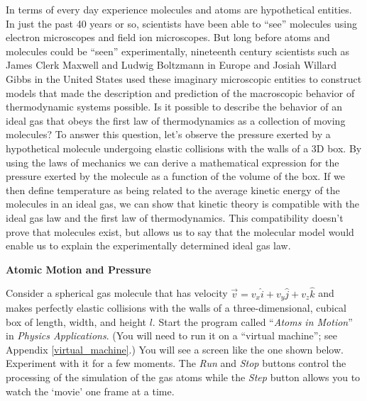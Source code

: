In terms of every day experience molecules and atoms are hypothetical
entities. In just the past 40 years or so, scientists have been able
to ``see'' molecules using electron microscopes and
field ion microscopes. But long before atoms and molecules could be
``seen'' experimentally, nineteenth century scientists
such as James Clerk Maxwell and Ludwig Boltzmann in Europe and Josiah
Willard Gibbs in the United States used these imaginary microscopic
entities to construct models that made the description and prediction
of the macroscopic behavior of thermodynamic systems possible. Is
it possible to describe the behavior of an ideal gas that obeys the
first law of thermodynamics as a collection of moving molecules? To
answer this question, let's observe the pressure exerted by a hypothetical
molecule undergoing elastic collisions with the walls of a 3D box.
By using the laws of mechanics we can derive a mathematical expression
for the pressure exerted by the molecule as a function of the volume
of the box. If we then define temperature as being related to the
average kinetic energy of the molecules in an ideal gas, we can show
that kinetic theory is compatible with the ideal gas law and the first
law of thermodynamics. This compatibility doesn't prove that molecules
exist, but allows us to say that the molecular model would enable
us to explain the experimentally determined ideal gas law.

\textbf{Atomic Motion and Pressure}

Consider a spherical gas molecule that has velocity 
$\overrightarrow{v}=v_{x} \hat{i}+v_{y}  \hat{j} + v_z\hat k$ and
makes perfectly elastic collisions with the walls of a three-dimensional, cubical
box of length, width, and height $l$.  Start the program called ``\textit{Atoms
in Motion}'' in \textit{Physics Applications}.  (You will need to run it on a ``virtual machine''; see Appendix \ref{virtual_machine}.)  You will see a screen
like the one shown below. Experiment with it for a few moments. 
The \textit{Run} and \textit{Stop} buttons control the processing of the 
simulation of the gas atoms while the \textit{Step} button allows you to watch the
`movie' one frame at a time.

